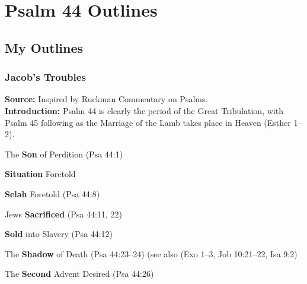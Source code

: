\section{Psalm 44 Outlines}

\subsection{My Outlines}

\subsubsection{Jacob's Troubles}
\textbf{Source: }Inspired by Ruckman Commentary on Psalms.\\
\textbf{Introduction: }Psalm 44 is clearly the period of the Great Tribulation, with Psalm 45 following as the Marriage of the Lamb takes place in Heaven (Esther 1--2).

\begin{compactenum}[I.][7]
    \item The \textbf{Son} of Perdition (Psa 44:1)
    \item \textbf{Situation} Foretold %
    \item \textbf{Selah} Foretold (Psa 44:8)
    \item Jews \textbf{Sacrificed} (Psa 44:11, 22)
    \item \textbf{Sold} into Slavery (Psa 44:12)
    \item The \textbf{Shadow} of Death (Psa 44:23--24) (see also       (Exo 1--3, Job 10:21--22, Isa 9:2)
    \item The \textbf{Second} Advent Desired (Psa 44:26)
\end{compactenum}

